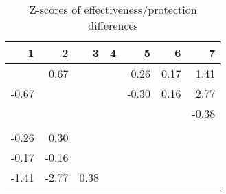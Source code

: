 \begin{table}[ht]
\centering
\begin{tabular}{rrrrrrr}
  \hline
1 & 2 & 3 & 4 & 5 & 6 & 7 \\ 
  \hline
 & 0.67 &  &  & 0.26 & 0.17 & 1.41 \\ 
  -0.67 &  &  &  & -0.30 & 0.16 & 2.77 \\ 
   &  &  &  &  &  & -0.38 \\ 
   &  &  &  &  &  &  \\ 
  -0.26 & 0.30 &  &  &  &  &  \\ 
  -0.17 & -0.16 &  &  &  &  &  \\ 
  -1.41 & -2.77 & 0.38 &  &  &  &  \\ 
   \hline
\end{tabular}
\caption{Z-scores of effectiveness/protection differences} 
\end{table}
